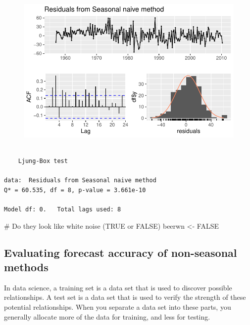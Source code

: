 \documentclass[
  letterpaper,
  DIV=11,
  numbers=noendperiod]{scrartcl}
\newenvironment{Shaded}{\begin{snugshade}}{\end{snugshade}}
\newcommand{\CommentTok}[1]{\textcolor[rgb]{0.37,0.37,0.37}{#1}}
\newcommand{\ConstantTok}[1]{\textcolor[rgb]{0.56,0.35,0.01}{#1}}
\newcommand{\NormalTok}[1]{\textcolor[rgb]{0.00,0.23,0.31}{#1}}
\newcommand{\OtherTok}[1]{\textcolor[rgb]{0.00,0.23,0.31}{#1}}
\begin{document}
\begin{figure}[H]

{\centering \includegraphics{forecasting_datacamp_ex_files/figure-pdf/unnamed-chunk-8-2.pdf}

}

\end{figure}

\begin{verbatim}

    Ljung-Box test

data:  Residuals from Seasonal naive method
Q* = 60.535, df = 8, p-value = 3.661e-10

Model df: 0.   Total lags used: 8
\end{verbatim}

\begin{Shaded}
\begin{Highlighting}[]
\CommentTok{\# Do they look like white noise (TRUE or FALSE)}
\NormalTok{beerwn }\OtherTok{\textless{}{-}} \ConstantTok{FALSE}
\end{Highlighting}
\end{Shaded}

\hypertarget{evaluating-forecast-accuracy-of-non-seasonal-methods}{%
\subsection{Evaluating forecast accuracy of non-seasonal
methods}\label{evaluating-forecast-accuracy-of-non-seasonal-methods}}

In data science, a training set is a data set that is used to discover
possible relationships. A test set is a data set that is used to verify
the strength of these potential relationships. When you separate a data
set into these parts, you generally allocate more of the data for
training, and less for testing.
\end{document}
